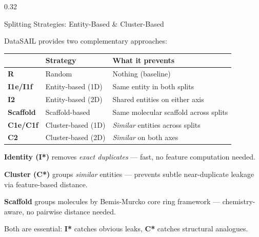 \documentclass[final]{beamer}
\begin{document}
\begin{frame}[t]
\begin{columns}[T]
\begin{column}{0.32\textwidth}
\begin{block}{Splitting Strategies: Entity-Based \& Cluster-Based}

DataSAIL provides two complementary approaches:

\vspace{0.3ex}
{\small
\renewcommand{\arraystretch}{1.4}
\begin{tabular}{@{} >{\bfseries}l p{3.5cm} p{5.5cm} @{}}
\toprule
 & \textbf{Strategy} & \textbf{What it prevents} \\
\midrule
\color{palmred}R & Random & Nothing (baseline) \\
\color{palmorange}I1e/I1f & Entity-based (1D) & Same entity in both splits \\
\color{palmorange}I2 & Entity-based (2D) & Shared entities on either axis \\
\color{palmblue}Scaffold & Scaffold-based & Same molecular scaffold across splits \\
\color{palmgreen}C1e/C1f & Cluster-based (1D) & \textit{Similar} entities across splits \\
\color{palmgreen}C2 & Cluster-based (2D) & \textit{Similar} on both axes \\
\bottomrule
\end{tabular}
}

\vspace{0.6ex}
{\color{palmorange}\textbf{Identity (I*)}} removes \textit{exact duplicates} --- fast, no feature computation needed.

\vspace{0.3ex}
{\color{palmgreen}\textbf{Cluster (C*)}} groups \textit{similar} entities --- prevents subtle near-duplicate leakage via feature-based distance.

\vspace{0.3ex}
{\color{palmblue}\textbf{Scaffold}} groups molecules by Bemis-Murcko core ring framework --- chemistry-aware, no pairwise distance needed.

\vspace{0.3ex}
Both are essential: \textbf{I*} catches obvious leaks, \textbf{C*} catches structural analogues.
\end{block}


\end{column}
\end{columns}
\end{frame}
\end{document}
